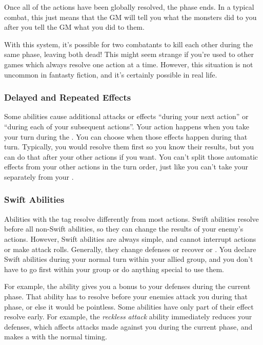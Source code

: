         Once all of the actions have been globally resolved, the phase ends.
        In a typical combat, this just means that the GM will tell you what the monsters did to you after you tell the GM what you did to them.

        With this system, it's possible for two combatants to kill each other during the same phase, leaving both dead!
        This might seem strange if you're used to other games which always resolve one action at a time.
        However, this situation is not uncommon in fantasty fiction, and it's certainly possible in real life.

        \subsubsection{Delayed and Repeated Effects}
            Some abilities cause additional attacks or effects ``during your next action'' or ``during each of your subsequent actions''.
            Your action happens when you take your turn during the .
            You can choose when those effects happen during that turn.
            Typically, you would resolve them first so you know their results, but you can do that after your other actions if you want.
            You can't split those automatic effects from your other actions in the turn order, just like you can't take your  separately from your .

        \subsubsection{Swift Abilities}\label{Swift Abilities}
            Abilities with the  tag resolve differently from most actions.
            Swift abilities resolve before all non-Swift abilities, so they can change the results of your enemy's actions.
            However, Swift abilities are always simple, and cannot interrupt actions or make attack rolls.
            Generally, they change defenses or recover  or .
            You declare Swift abilities during your normal turn within your allied group, and you don't have to go first within your group or do anything special to use them.

            For example, the  ability gives you a bonus to your defenses during the current phase.
            That ability has to resolve before your enemies attack you during that phase, or else it would be pointless.
            Some abilities have only part of their effect resolve early.
            For example, the \textit{reckless attack} ability immediately reduces your defenses, which affects attacks made against you during the current phase, and makes a  with the normal timing.

